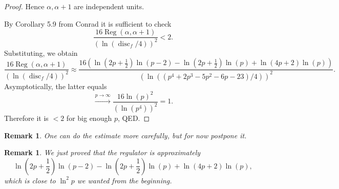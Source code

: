 \documentclass[a4paper]{article}
\newtheorem{Rem}[Thm]{Remark}
\DeclareMathOperator{\Reg}{Reg}        %
\DeclareMathOperator{\disc}{disc}        %
\begin{document}
\begin{proof}
Hence $\alpha, \alpha + 1$ are independent units. 

By Corollary 5.9 from Conrad it is sufficient to check
\[
\frac{16 \Reg(\alpha, \alpha + 1) }
{(\ln(\disc_f/4))^2} 
< 2
.\] 
Substituting, we obtain
\[
\frac{16 \Reg(\alpha, \alpha + 1) }
{(\ln(\disc_f/4))^2} 
\approx
\frac{16 (
\ln(2 p + \frac{1}{2}) \ln(p - 2) - \ln(2 p + \frac{1}{2}) \ln(p) + \ln(4p + 2) \ln(p)
) }
{(\ln(
(p^4 + 2 p^3 - 5 p^2 - 6 p - 23)
/4))^2} 
.\] 
Asymptotically, the latter equals
\[
\stackrel{p \to \infty}{\longrightarrow}
\frac{16 
\ln(p)^2
}
{(\ln(
p^4 ))^2} = 1
.\] 
Therefore it is $< 2$ for big enough $p$, QED.
\end{proof}
\begin{Rem}
One can do the estimate more carefully, but for now postpone it. 
\end{Rem}
\begin{Rem}
We just proved that the regulator is approximately 
\[
\ln(2 p + \frac{1}{2}) \ln(p - 2) - \ln(2 p + \frac{1}{2}) \ln(p) + \ln(4p + 2) \ln(p)
,\] 
which is close to $\ln^2 p$ we wanted from the beginning.
\end{Rem}
\end{document}
